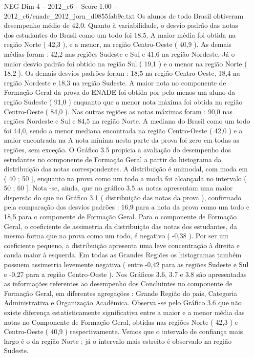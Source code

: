 \begin{textsample}{NEG Dim 4 – 2012\_c6 – Score 1.00 – 2012\_c6/enade\_2012\_jorn\_d0855fab9c.txt}
Os alunos de todo Brasil obtiveram desempenho médio de 42,0.
Quanto à variabilidade, o desvio padrão das notas dos estudantes do Brasil como um todo foi 18,5.
A maior média foi obtida na região Norte ( 42,3 ), e a menor, na região Centro-Oeste ( 40,9 ).
As demais médias foram : 42,2 nas regiões Sudeste e Sul e 41,6 na região Nordeste.
Já o maior desvio padrão foi obtido na região Sul ( 19,1 ) e o menor na região Norte ( 18,2 ).
Os demais desvios padrões foram : 18,5 na região Centro-Oeste, 18,4 na região Nordeste e 18,3 na região Sudeste.
A maior nota no componente de Formação Geral da prova do ENADE foi obtida por pelo menos um aluno da região Sudeste ( 91,0 ) enquanto que a menor nota máxima foi obtida na região Centro-Oeste ( 84,0 ).
Nas outras regiões as notas máximas foram : 90,0 nas regiões Nordeste e Sul e 84,5 na região Norte.
A mediana do Brasil como um todo foi 44,0, sendo a menor mediana encontrada na região Centro-Oeste ( 42,0 ) e a maior encontrada na A nota mínima nesta parte da prova foi zero em todas as regiões, sem exceção.
O Gráfico 3.5 propicia a avaliação do desempenho dos estudantes no componente de Formação Geral a partir do histograma da distribuição das notas correspondentes.
A distribuição é unimodal, com moda em ( 40 ; 50 ], enquanto na prova como um todo a moda foi alcançada no intervalo ( 50 ; 60 ].
Nota -se, ainda, que no gráfico 3.5 as notas apresentam uma maior dispersão do que no Gráfico 3.1 ( distribuição das notas da prova ), confirmado pela comparação dos desvios padrões : 16,9 para a nota da prova como um todo e 18,5 para o componente de Formação Geral.
Para o componente de Formação Geral, o coeficiente de assimetria da distribuição das notas dos estudantes, da mesma forma que na prova como um todo, é negativo ( -0,38 ).
Por ser um coeficiente pequeno, a distribuição apresenta uma leve concentração à direita e cauda maior à esquerda.
Em todas as Grandes Regiões os histogramas também possuem assimetria levemente negativa ( entre -0,42 para as regiões Sudeste e Sul e -0,27 para a região Centro-Oeste ).
Nos Gráficos 3.6, 3.7 e 3.8 são apresentadas as informações referentes ao desempenho dos Concluintes no componente de Formação Geral, em diferentes agregações : Grande Região do país, Categoria Administrativa e Organização Acadêmica.
Observa -se pelo Gráfico 3.6 que não existe diferença estatisticamente significativa entre a maior e a menor média das notas no Componente de Formação Geral, obtidas nas regiões Norte ( 42,3 ) e Centro-Oeste ( 40,9 ) respectivamente.
Vemos que o intervalo de confiança mais largo é o da região Norte ; já o intervalo mais estreito é observado na região Sudeste.

\end{textsample}
